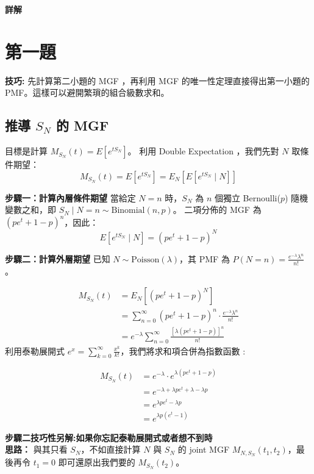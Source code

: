 \documentclass{article}
\begin{document}
\clearpage
\begin{center}
{\Huge \textbf{詳解}}
\end{center}

\section*{第一題}
\textbf{技巧:} 先計算第二小題的 MGF ，再利用 MGF 的唯一性定理直接得出第一小題的 PMF。這樣可以避開繁瑣的組合級數求和。

\subsection*{推導 $S_N$ 的 MGF}

目標是計算 $M_{S_N}(t) = E[e^{t S_N}]$。
利用 Double Expectation ，我們先對 $N$ 取條件期望：
$$ M_{S_N}(t) = E[e^{t S_N}] = E_N \left[ E [e^{t S_N} \mid N] \right] $$

\noindent
\textbf{步驟一：計算內層條件期望}
當給定 $N=n$ 時，$S_N$ 為 $n$ 個獨立 Bernoulli($p$) 隨機變數之和，即 $S_N \mid N=n \sim \text{Binomial}(n, p)$。
二項分佈的 MGF 為 $(pe^t + 1-p)^n$，因此：
$$ E[e^{t S_N} \mid N] = (pe^t + 1-p)^N $$

\noindent
\textbf{步驟二：計算外層期望}
已知 $N \sim \text{Poisson}(\lambda)$，其 PMF 為 $P(N=n) = \frac{e^{-\lambda}\lambda^n}{n!}$。

\begin{align*}
M_{S_N}(t) &= E_N \left[ (pe^t + 1-p)^N \right] \\
&= \sum_{n=0}^{\infty} (pe^t + 1-p)^n \cdot \frac{e^{-\lambda}\lambda^n}{n!} \\
&= e^{-\lambda} \sum_{n=0}^{\infty} \frac{\left[ \lambda(pe^t + 1-p) \right]^n}{n!}
\end{align*}
利用泰勒展開式 $e^x = \sum_{k=0}^\infty \frac{x^k}{k!}$，我們將求和項合併為指數函數 :


\begin{align*}
M_{S_N}(t) &= e^{-\lambda} \cdot e^{\lambda(pe^t + 1-p)} \\
&= e^{-\lambda + \lambda p e^t + \lambda - \lambda p} \\
&= e^{\lambda p e^t - \lambda p} \\
&= e^{\lambda p (e^t - 1)}
\end{align*}

\noindent
\textbf{步驟二技巧性另解:如果你忘記泰勒展開式或者想不到時}\\
\textbf{思路：} 與其只看 $S_N$，不如直接計算 $N$ 與 $S_N$ 的 joint MGF $M_{N, S_N}(t_1, t_2)$，最後再令 $t_1=0$ 即可還原出我們要的 $M_{S_N}(t_2)$。
\end{document}
